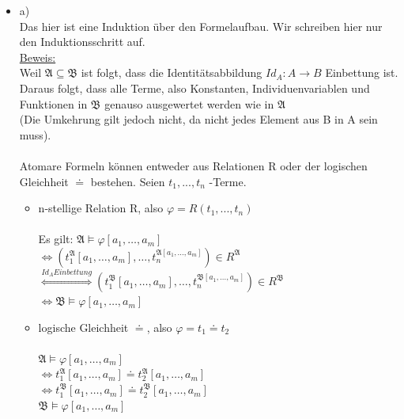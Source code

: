\documentclass[a4paper]{scrartcl}
\begin{document}
    \begin{itemize}
        \item a)\\
            Das hier ist eine Induktion über den Formelaufbau. Wir schreiben hier nur den Induktionsschritt auf.\\

            \underline{Beweis:}\\ 
            Weil $\mathfrak{A} \subseteq \mathfrak{B}$ ist folgt, dass die Identitätsabbildung $Id_A: A \rightarrow B$ Einbettung ist.\\
            Daraus folgt, dass alle Terme, also Konstanten, Individuenvariablen und Funktionen in $\mathfrak{B}$ genauso ausgewertet werden wie in $\mathfrak{A}$\\
            (Die Umkehrung gilt jedoch nicht, da nicht jedes Element aus B in A sein muss).\\

            \\Atomare Formeln können entweder aus Relationen R oder der logischen Gleichheit $\doteq$ bestehen. Seien $t_1,...,t_n$ -Terme.\\
            
            \begin{itemize}
                \item n-stellige Relation R, also $\varphi = R(t_1,...,t_n)$\\
                    \\Es gilt: $\mathfrak{A} \models \varphi[a_1,\dots,a_m]$\\
                    $\Leftrightarrow (t_1^{\mathfrak{A}}[a_1,\dots,a_m],\dots,t_n^{\mathfrak{A}[a_1,\dots,a_m]}) \in R^{\mathfrak{A}}$\\
                    $\overset{Id_A Einbettung}{\Leftrightarrow} (t_1^{\mathfrak{B}}[a_1,\dots,a_m],\dots,t_n^{\mathfrak{B}[a_1,\dots,a_m]}) \in R^{\mathfrak{B}}$\\
                    $\Leftrightarrow \mathfrak{B} \models \varphi[a_1,\dots,a_m]$\\
                
                \item logische Gleichheit $\doteq$, also $\varphi = t_1 \doteq t_2$\\
                    \\$\mathfrak{A} \models \varphi[a_1,\dots,a_m]$\\
                    $\Leftrightarrow t_1^{\mathfrak{A}}[a_1,\dots,a_m] \doteq t_2^{\mathfrak{A}}[a_1,\dots,a_m]$\\
                    $\Leftrightarrow t_1^{\mathfrak{B}}[a_1,\dots,a_m] \doteq t_2^{\mathfrak{B}}[a_1,\dots,a_m]$\\
                    $\mathfrak{B} \models \varphi[a_1,\dots,a_m]$\\


\end{itemize}
\end{itemize}
\end{document}
